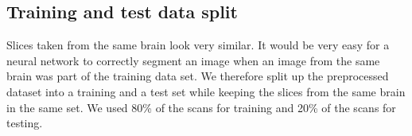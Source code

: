 \subsection{Training and test data split}

Slices taken from the same brain look very similar. It would be very easy for a neural network to correctly segment an image when an image from the same brain was part of the training data set.
We therefore split up the preprocessed dataset into a training and a test set while keeping the slices from the same brain in the same set. We used 80\% of the scans for training and 20\% of the scans for testing.
